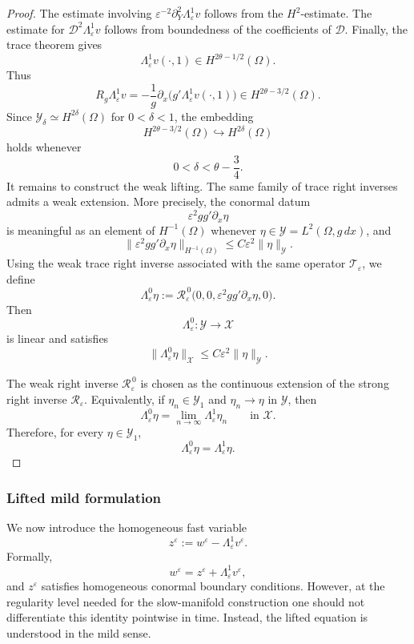 \documentclass[11pt]{article}
\theoremstyle{definition}
\theoremstyle{remark}
\numberwithin{equation}{section}
\newcommand{\mc}[1]{\mathcal{#1}}
\begin{document}
\begin{proof}
The estimate involving
\(\varepsilon^{-2}\partial_Y^2\Lambda_\varepsilon^1v\) follows from the
\(H^2\)-estimate. The estimate for \(\mathcal D^2\Lambda_\varepsilon^1v\)
follows from boundedness of the coefficients of \(\mathcal D\). Finally, the
trace theorem gives
\[
\Lambda_\varepsilon^1v(\cdot,1)\in H^{2\theta-1/2}(\Omega).
\]
Thus
\[
R_g\Lambda_\varepsilon^1v
=
-\frac1g\partial_x\bigl(g'\Lambda_\varepsilon^1v(\cdot,1)\bigr)
\in H^{2\theta-3/2}(\Omega).
\]
Since \(\mathcal Y_\delta\simeq H^{2\delta}(\Omega)\) for
\(0<\delta<1\), the embedding
\[
H^{2\theta-3/2}(\Omega)\hookrightarrow H^{2\delta}(\Omega)
\]
holds whenever
\[
0<\delta<\theta-\frac34.
\]
It remains to construct the weak lifting. The same family of trace right
inverses admits a weak extension. More precisely, the conormal datum
\[
\varepsilon^2gg'\partial_x\eta
\]
is meaningful as an element of \(H^{-1}(\Omega)\) whenever
\(\eta\in \mc Y=L^2(\Omega,g\,dx)\), and
\[
\|\varepsilon^2gg'\partial_x\eta\|_{H^{-1}(\Omega)}
\le C\varepsilon^2\|\eta\|_{\mc Y}.
\]
Using the weak trace right inverse associated with the same operator
\(\mathcal T_\varepsilon\), we define
\[
\Lambda_\varepsilon^0\eta
:=
\mathcal R_\varepsilon^{\,0}
\bigl(0,0,\varepsilon^2gg'\partial_x\eta,0\bigr).
\]
Then
\[
\Lambda_\varepsilon^0:\mc Y\to\mc X
\]
is linear and satisfies
\[
\|\Lambda_\varepsilon^0\eta\|_{\mc X}
\le C\varepsilon^2\|\eta\|_{\mc Y}.
\]

The weak right inverse \(\mathcal R_\varepsilon^{\,0}\) is chosen as the
continuous extension of the strong right inverse
\(\mathcal R_\varepsilon\). Equivalently, if
\(\eta_n\in\mc Y_1\) and \(\eta_n\to\eta\) in \(\mc Y\), then
\[
\Lambda_\varepsilon^0\eta
=
\lim_{n\to\infty}\Lambda_\varepsilon^1\eta_n
\qquad\text{in }\mc X.
\]
Therefore, for every \(\eta\in\mc Y_1\),
\[
\Lambda_\varepsilon^0\eta=\Lambda_\varepsilon^1\eta .
\]
\end{proof}

\subsubsection*{Lifted mild formulation}
\label{subsubsec:thin-domain-lifted-mild-system}

We now introduce the homogeneous fast variable
\[
z^\varepsilon:=w^\varepsilon-\Lambda_\varepsilon^1v^\varepsilon.
\]
Formally,
\[
w^\varepsilon=z^\varepsilon+\Lambda_\varepsilon^1v^\varepsilon,
\]
and \(z^\varepsilon\) satisfies homogeneous conormal boundary conditions.
However, at the regularity level needed for the slow-manifold construction one
should not differentiate this identity pointwise in time. Instead, the lifted
equation is understood in the mild sense.
\end{document}
